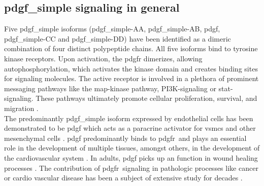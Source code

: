     \subsection{\ac{pdgf_simple} signaling in general}
    \label{subsec:pdgf_the_cytokine}
    Five \ac{pdgf_simple} isoforms (\ac{pdgf_simple}-AA, \ac{pdgf_simple}-AB, \ac{pdgf}, \ac{pdgf_simple}-CC and \ac{pdgf_simple}-DD) have been identified as a dimeric combination of four distinct polypeptide chains. All five isoforms bind to tyrosine kinase receptors. Upon activation, the \ac{pdgfr} dimerizes, allowing autophosphorylation, which activates the kinase domain and creates binding sites for signaling molecules. The active receptor is involved in a plethora of prominent messaging pathways like the \ac{map}-kinase pathway, \ac{PI3K}-signaling or \ac{stat}-signaling. These pathways ultimately promote cellular proliferation, survival, and migration \cite{chenPlateletderivedGrowthFactors2013, heldinTargetingPDGFSignaling2013, huTargetingPlateletderivedGrowth2015}.\\
    The predominantly \ac{pdgf_simple} isoform expressed by endothelial cells has been demonstrated to be \ac{pdgf} \cite{andraeRolePlateletderivedGrowth2008, heldinTargetingPDGFSignaling2013} which acts as a paracrine activator for \acp{vsmc} and other mesenchymal cells \cite{heldinTargetingPDGFSignaling2013}. \ac{pdgf} predominantly binds to \ac{pdgfr}\beta~and plays an essential role in the development of multiple tissues, amongst others, in the development of the cardiovascular system \cite{leveenMiceDeficientPDGF1994}. In adults, \ac{pdgf} picks up an function in wound healing processes \cite{robsonPlateletderivedGrowthFactor1992}. The contribution of \ac{pdgfr}\beta~signaling in pathologic processes like cancer or cardio vascular disease has been a subject of extensive study for decades \cite{heldinTargetingPDGFSignaling2013, rainesPDGFCardiovascularDisease2004}.

